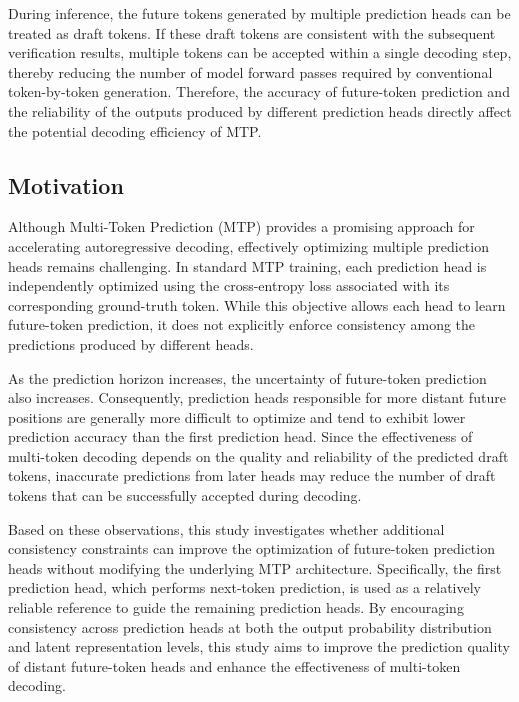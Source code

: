 During inference, the future tokens generated by multiple prediction heads can be treated as draft tokens. If these draft tokens are consistent with the subsequent verification results, multiple tokens can be accepted within a single decoding step, thereby reducing the number of model forward passes required by conventional token-by-token generation. Therefore, the accuracy of future-token prediction and the reliability of the outputs produced by different prediction heads directly affect the potential decoding efficiency of MTP.

\subsection{Motivation}

Although Multi-Token Prediction (MTP) provides a promising approach for accelerating autoregressive decoding, effectively optimizing multiple prediction heads remains challenging. In standard MTP training, each prediction head is independently optimized using the cross-entropy loss associated with its corresponding ground-truth token. While this objective allows each head to learn future-token prediction, it does not explicitly enforce consistency among the predictions produced by different heads.

As the prediction horizon increases, the uncertainty of future-token prediction also increases. Consequently, prediction heads responsible for more distant future positions are generally more difficult to optimize and tend to exhibit lower prediction accuracy than the first prediction head. Since the effectiveness of multi-token decoding depends on the quality and reliability of the predicted draft tokens, inaccurate predictions from later heads may reduce the number of draft tokens that can be successfully accepted during decoding.

Based on these observations, this study investigates whether additional consistency constraints can improve the optimization of future-token prediction heads without modifying the underlying MTP architecture. Specifically, the first prediction head, which performs next-token prediction, is used as a relatively reliable reference to guide the remaining prediction heads. By encouraging consistency across prediction heads at both the output probability distribution and latent representation levels, this study aims to improve the prediction quality of distant future-token heads and enhance the effectiveness of multi-token decoding.

